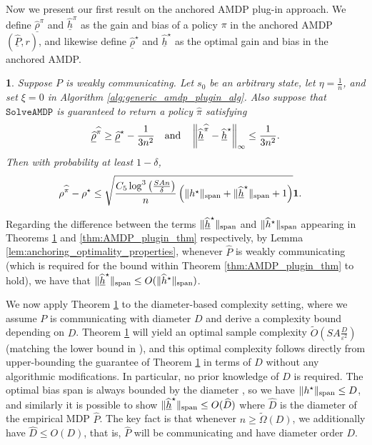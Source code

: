 \documentclass{article}
\theoremstyle{plain}
\newtheorem{thm}{\protect\theoremname}
\theoremstyle{plain}
\theoremstyle{remark}
\theoremstyle{plain}
\theoremstyle{plain}
\providecommand{\theoremname}{Theorem}
\newcommand{\Phat}{\widehat{P}}
\newcommand{\one}{\mathbf{1}}
\newcommand{\pihat}{\widehat{\pi}}
\newcommand{\rhohat}{\widehat{\rho}}
\newcommand{\hhat}{\widehat{h}}
\newcommand{\Otilde}{\widetilde{O}}
\newcommand{\SolveAMDP}{\texttt{SolveAMDP}}
\newcommand{\Phatanc}{\underline{\Phat}}
\newcommand{\rhohatanc}{ \underline{\rhohat}}
\newcommand{\hhatanc}{\underline{\hhat}}
\newcommand{\plugin}{plug-in\xspace}
\begin{document}
Now we present our first result on the anchored AMDP \plugin approach. We define $\rhohatanc^{\pi}$ and $ \hhatanc^{\pi}$ as the gain and bias of a policy $\pi$ in the anchored AMDP $(\Phatanc, r)$, and likewise define $\rhohatanc^\star$ and $\hhatanc^\star$ as the optimal gain and bias in the anchored AMDP.
\begin{thm}
    \label{thm:AMDP_anchored_nopert}
    Suppose $P$ is weakly communicating. Let $s_0$ be an arbitrary state, let $\eta = \frac{1}{n}$, and set $\xi = 0$ in Algorithm \ref{alg:generic_amdp_plugin_alg}. Also suppose that $\SolveAMDP$ is guaranteed to return a policy $\pihat$ satisfying
    \begin{align}
       \rhohatanc^{\pihat} \geq \rhohatanc^\star - \frac{1}{3n^2} \quad\text{and}\quad \infnorm{\hhatanc^{\pihat} - \hhatanc^\star} \leq \frac{1}{3n^2} . \label{eq:solveamdp_opt_cond_1}
    \end{align}
   Then with probability at least $1-\delta$,
    \begin{align*}
        \rho^{\pihat} - \rho^\star & \leq  \sqrt{\frac{C_5 \log^3 \left( \frac{SAn}{\delta} \right)}{n} \left( \spannorm{h^\star} + \spannorm{\hhatanc^{\star}} + 1 \right) }\one.
    \end{align*}
\end{thm}
Regarding the difference between the terms $\spannorm{\hhatanc^\star}$ and $\spannorm{\hhat^\star}$ appearing in Theorems \ref{thm:AMDP_anchored_nopert} and \ref{thm:AMDP_plugin_thm} respectively, by Lemma \ref{lem:anchoring_optimality_properties}, whenever $\Phat$ is weakly communicating (which is required for the bound within Theorem \ref{thm:AMDP_plugin_thm} to hold), we have that $\spannorm{\hhatanc^\star} \leq O(\spannorm{\hhat^\star})$.


We now apply Theorem \ref{thm:AMDP_anchored_nopert} to the diameter-based complexity setting, where we assume $P$ is communicating with diameter $D$ and derive a complexity bound depending on $D$. Theorem \ref{thm:AMDP_anchored_nopert} will yield an optimal sample complexity $\Otilde \left( SA \frac{D}{\varepsilon^2} \right)$ (matching the lower bound in \citealt{wang_near_2022}), and this optimal complexity follows directly from upper-bounding the guarantee of Theorem \ref{thm:AMDP_anchored_nopert} in terms of $D$ without any algorithmic modifications. In particular, no prior knowledge of $D$ is required.
The optimal bias span is always bounded by the diameter \citep{bartlett_regal_2012, lattimore_bandit_2020}, so we have $\Vert h^\star\Vert _{\textnormal{span}} \leq D$, and similarly it is possible to show $\spannorm{\hhatanc^\star} \leq O(\widehat{D})$ where $\widehat{D}$ is the diameter of the empirical MDP $\Phat$. The key fact is that whenever $n \geq \widetilde{\Omega}(D)$, we additionally have $\widehat{D} \leq O(D)$, that is, $\Phat$ will be communicating and have diameter order $D$.
\end{document}
